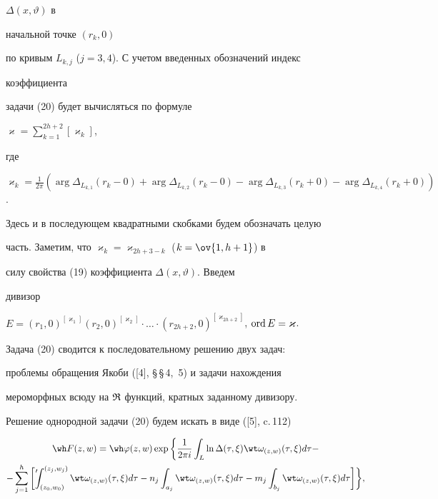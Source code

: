 $\Delta(x,\vartheta)$ в 


начальной точке $(r_k,0)$ 


по кривым $L_{k,j}$ ($j=3,4$). С учетом введенных обозначений индекс 


коэффициента 


задачи (20) будет вычисляться по формуле 


$\varkappa=\sum\limits^{2h+2}_{k=1}[\varkappa_k]$, 


где 


$\varkappa_k=\frac{1}{2\pi}(\arg\Delta_{L_{k,1}}(r_k-0)+ 


\arg\Delta_{L_{k,2}}(r_k-0)-\arg\Delta_{L_{k,3}}(r_k+0)- 


\arg\Delta_{L_{k,4}}(r_k+0))$. 


Здесь и в последующем квадратными скобками будем обозначать целую 


часть. Заметим, что $\varkappa_k=\varkappa_{2h+3-k}$ ($k=\ov{1,h+1}$) в 


силу свойства (19) коэффициента $\Delta(x,\vartheta)$. Введем 


дивизор 


$E=(r_1,0)^{[\varkappa_1]}(r_2,0)^{[\varkappa_2]}\cdot\dotsc\cdot 


(r_{2h+2},0)^{[\varkappa_{2h+2}]}$, $\ord E=\varkappa$. 


Задача (20) сводится к последовательному решению двух задач: 


проблемы обращения Якоби ([4], \S\,\S\,4,~5) и задачи нахождения 


мероморфных всюду на $\frak R$ функций, кратных заданному дивизору. 


 


Решение однородной задачи (20) будем искать в виде ([5], c.\,112) 


\begin{multline} 


\wh F(z,w)=\wh\varphi(z,w)\exp\bigg\{\frac{1}{2\pi i}\int_L 


\ln\Delta(\tau,\xi)\wt\omega_{(z,w)}(\tau,\xi)d\tau- \\ 


% 


-\sum^h_{j=1}\bigg[\fuckprime\int^{(z_j,w_j)}_{(z_0,w_0)} 


\wt\omega_{(z,w)}(\tau,\xi)d\tau-n_j\int_{a_j} 


\wt\omega_{(z,w)}(\tau,\xi)d\tau-m_j\int_{b_j} 


\wt\omega_{(z,w)}(\tau,\xi)d\tau\bigg]\bigg\}, 


\end{multline} 



